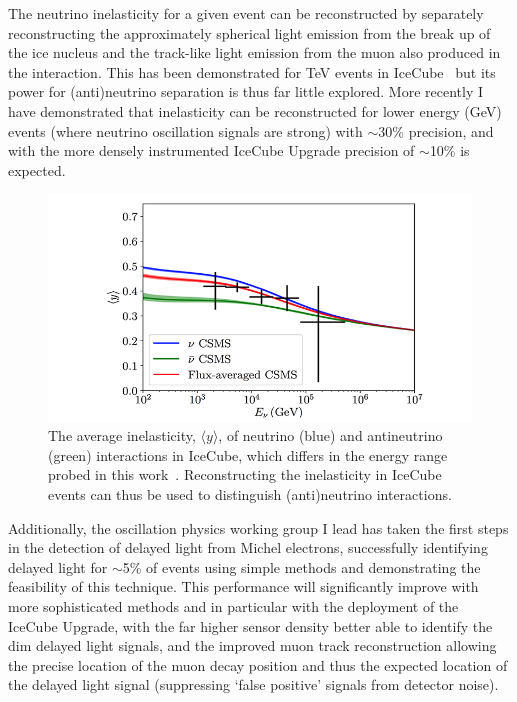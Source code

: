 \documentclass[a4paper,11pt]{article}
\begin{document}
The neutrino inelasticity for a given event can be reconstructed by separately reconstructing the approximately spherical light emission from the break up of the ice nucleus and the track-like light emission from the muon also produced in the interaction. This has been demonstrated for TeV events in IceCube~\cite{Aartsen:2018vez} but its power for (anti)neutrino separation is thus far little explored. More recently I have demonstrated that inelasticity can be reconstructed for lower energy (GeV) events (where neutrino oscillation signals are strong) with $\sim$30\% precision, and with the more densely instrumented IceCube Upgrade precision of $\sim$10\% is expected. 

\begin{figure} %
    \centering
    \includegraphics[trim=2.0cm 0.0cm 1.0cm 0.0cm, clip=true, width=\linewidth]{images/inelasticity.png}
    \caption{The average inelasticity, $\langle y \rangle$, of neutrino (blue) and antineutrino (green) interactions in IceCube, which differs in the energy range probed in this work~\cite{Aartsen:2018vez}. Reconstructing the inelasticity in IceCube events can thus be used to distinguish (anti)neutrino interactions.}
    \label{fig:inelasticity}
\end{figure}

Additionally, the oscillation physics working group I lead has taken the first steps in the detection of delayed light from Michel electrons, successfully identifying delayed light for $\sim$5\% of events using simple methods and demonstrating the feasibility of this technique. This performance will significantly improve with more sophisticated methods and in particular with the deployment of the IceCube Upgrade, with the far higher sensor density better able to identify the dim delayed light signals, and the improved muon track reconstruction allowing the precise location of the muon decay position and thus the expected location of the delayed light signal (suppressing `false positive' signals from detector noise). 
\end{document}
